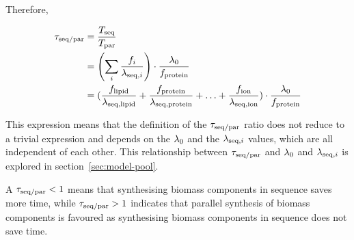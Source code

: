 Therefore,

\begin{equation}
  \begin{aligned}
    \tau_{\mathrm{seq}/\mathrm{par}} &= \frac{T_{\mathrm{seq}}}{T_{\mathrm{par}}} \\
    & = \left( \sum_i \frac{f_i}{\lambda_{\mathrm{seq},i}} \right) \cdot \frac{\lambda_{0}}{f_{\mathrm{protein}}} \\
    & = (\frac{f_{\mathrm{lipid}}}{\lambda_{\mathrm{seq},\mathrm{lipid}}} + \frac{f_{\mathrm{protein}}}{\lambda_{\mathrm{seq},\mathrm{protein}}} + \ldots + \frac{f_{\mathrm{ion}}}{\lambda_{\mathrm{seq},\mathrm{ion}}}) \cdot \frac{\lambda_{0}}{f_{\mathrm{protein}}}
    \end{aligned}
  \label{eq:model-ratio}
\end{equation}

This expression means that the definition of the $\tau_{\mathrm{seq}/\mathrm{par}}$ ratio does not reduce to a trivial expression and depends on the $\lambda_{0}$ and the $\lambda_{\mathrm{seq},i}$ values, which are all independent of each other.
This relationship between $\tau_{\mathrm{seq}/\mathrm{par}}$ and $\lambda_{0}$ and $\lambda_{\mathrm{seq},i}$ is explored in section~\ref{sec:model-pool}.

A $\tau_{\mathrm{seq}/\mathrm{par}} < 1$ means that synthesising biomass components in sequence saves more time, while $\tau_{\mathrm{seq}/\mathrm{par}} > 1$ indicates that parallel synthesis of biomass components is favoured as synthesising biomass components in sequence does not save time.

